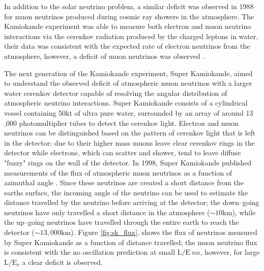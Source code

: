 In addition to the solar neutrino problem, a similar deficit was observed in
1988 for muon neutrinos produced during cosmic ray showers in the atmosphere.
The Kamiokande experiment was able to measure both electron and muon neutrino 
interactions via the cerenkov radiation produced by the charged leptons in 
water, their data was consistent with the expected rate of electron neutrinos 
from the atmosphere, however, a deficit of muon neutrinos was observed
\cite{Hirata1988}. 

The next generation of the Kamiokande experiment, Super Kamiokande, aimed to
understand the observed deficit of atmospheric muon neutrinos with a larger 
water cerenkov detector capable of resolving the angular distribution of 
atmospheric neutrino interactions. Super Kamiokande consists of a cylindrical 
vessel containing 50kt of ultra pure water, surrounded by an array of around 13
,000 photomultiplier tubes to detect the cerenkov light. Electron and muon 
neutrinos can be distinguished based on the pattern of cerenkov light that is 
left in the detector; due to their higher mass muons leave clear cerenkov 
rings in the detector while electrons, which can scatter and shower, tend to 
leave diffuse "fuzzy" rings on the wall of the detector. In 1998, Super 
Kamiokande published measurements of the flux of atmospheric muon neutrinos as 
a function of azimuthal angle \cite{Fukuda1998}. Since these neutrinos are created a 
short distance from the earths surface, the incoming angle of the neutrino can 
be used to estimate the distance travelled by the neutrino before arriving at 
the detector; the down--going neutrinos have only travelled a short distance in 
the atmosphere (\(\sim 10\mbox{km}\)), while the up--going neutrinos have 
travelled through the entire earth to reach the detector (\(\sim 13,000\mbox{km
}\)). Figure \ref{fig:sk_flux}, shows the flux of neutrinos measured by Super 
Kamiokande as a function of distance travelled; the muon neutrino flux is 
consistent with the no oscillation prediction at small \(\mbox{L} / \mbox{E}_\
nu\), however, for large \(\mbox{L} / \mbox{E}_\nu\) a clear deficit is 
observed. 

